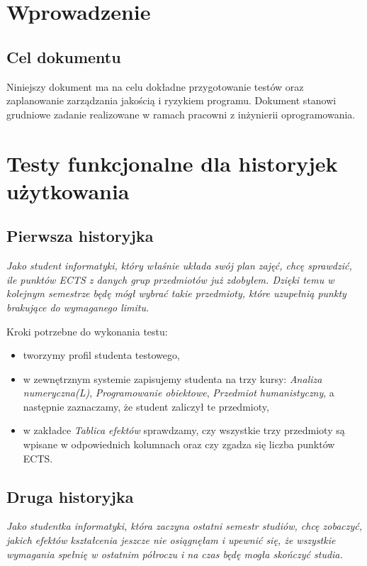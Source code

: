 \documentclass{article}
\begin{document}
\tableofcontents

\newpage


\section{Wprowadzenie}

\subsection{Cel dokumentu}
Niniejszy dokument ma na celu dokładne przygotowanie testów oraz zaplanowanie zarządzania jakością i ryzykiem programu.
Dokument stanowi grudniowe zadanie realizowane w ramach pracowni z inżynierii oprogramowania.


\section{Testy funkcjonalne dla historyjek użytkowania}
\subsection{Pierwsza historyjka}
\textit{Jako student informatyki, który właśnie układa swój plan zajęć, chcę sprawdzić, ile punktów ECTS z danych grup przedmiotów już zdobyłem.
Dzięki temu w kolejnym semestrze będę mógł wybrać takie przedmioty, które uzupełnią punkty brakujące do wymaganego limitu.}

\medskip
\noindent Kroki potrzebne do wykonania testu:
\begin{itemize}
 \item tworzymy profil studenta testowego,
 \item w zewnętrznym systemie zapisujemy studenta na trzy kursy: \textit{Analiza numeryczna(L)}, \textit{Programowanie obiektowe}, \textit{Przedmiot humanistyczny}, a następnie zaznaczamy, że student zaliczył te przedmioty,
 \item w zakładce \textit{Tablica efektów} sprawdzamy, czy wszystkie trzy przedmioty są wpisane w odpowiednich kolumnach oraz czy zgadza się liczba punktów ECTS.
\end{itemize}


\subsection{Druga historyjka}
\textit{Jako studentka informatyki, która zaczyna ostatni semestr studiów, chcę zobaczyć, jakich efektów kształcenia jeszcze nie osiągnęłam i upewnić się, że wszystkie wymagania spełnię w ostatnim półroczu i na czas będę mogła skończyć studia.}
\end{document}
